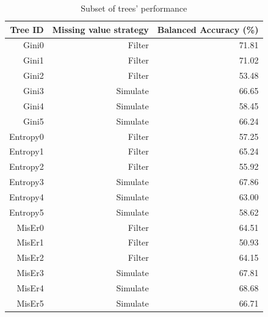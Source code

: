 \documentclass{article}
\begin{document}
\begin{table}[H]
    \centering        
    \begin{tabular}{r|r|r}
        Tree ID  & Missing value strategy & Balanced Accuracy (\%)\\\hline
        Gini0 & Filter &71.81\\
        Gini1 & Filter &71.02\\
        Gini2 & Filter &53.48\\\hline
        Gini3 & Simulate & 66.65\\
        Gini4 & Simulate & 58.45\\
        Gini5 & Simulate & 66.24\\\hline\hline
        Entropy0 & Filter & 57.25 \\
        Entropy1 & Filter & 65.24\\
        Entropy2 & Filter & 55.92\\\hline
        Entropy3 & Simulate & 67.86\\
        Entropy4 & Simulate & 63.00\\
        Entropy5 & Simulate & 58.62\\\hline\hline
        MisEr0 & Filter & 64.51\\
        MisEr1 & Filter & 50.93\\
        MisEr2 & Filter & 64.15\\\hline
        MisEr3 & Simulate & 67.81\\
        MisEr4 & Simulate & 68.68\\
        MisEr5 & Simulate & 66.71\\\hline\hline
        
    \end{tabular}
    \caption{Subset of trees' performance}
\end{table}
\end{document}
